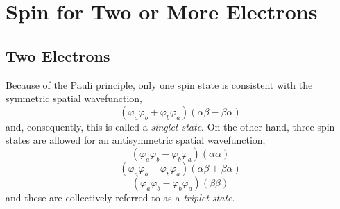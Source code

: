 \section{Spin for Two or More Electrons}

\subsection{Two Electrons}
    
Because of the Pauli principle, only one spin state is consistent with the
symmetric spatial wavefunction,
\begin{equation}
\left( \varphi_a \varphi_b + \varphi_b \varphi_a \right) \left( \alpha 
\beta - \beta \alpha \right)
\label{chap4-eqno17}
\end{equation}
and, consequently, this is called a \emph{singlet state}.  On the
other hand, three spin states are allowed for an antisymmetric spatial
wavefunction,
\begin{equation}
\left( \varphi_a \varphi_b - \varphi_b \varphi_a \right)\left( \alpha 
\alpha \right)
\label{chap4-eqno18a}
\end{equation}
\begin{equation}
\left( \varphi_a \varphi_b - \varphi_b \varphi_a \right)\left( \alpha 
\beta + \beta \alpha \right)
\label{chap4-eqno18b}
\end{equation}
\begin{equation}
\left( \varphi_a \varphi_b - \varphi_b \varphi_a \right)\left( \beta 
\beta \right)
\label{chap4-eqno18c}
\end{equation}
and these are collectively referred to as a \emph{triplet state}.

